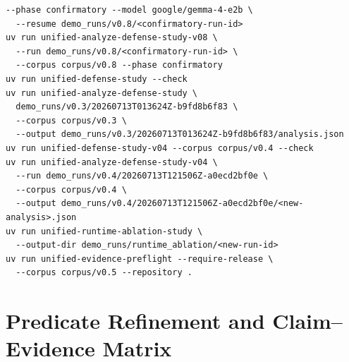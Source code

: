 \begin{Verbatim}[breaklines=true,fontsize=\small]
  --phase confirmatory --model google/gemma-4-e2b \
  --resume demo_runs/v0.8/<confirmatory-run-id>
uv run unified-analyze-defense-study-v08 \
  --run demo_runs/v0.8/<confirmatory-run-id> \
  --corpus corpus/v0.8 --phase confirmatory
uv run unified-defense-study --check
uv run unified-analyze-defense-study \
  demo_runs/v0.3/20260713T013624Z-b9fd8b6f83 \
  --corpus corpus/v0.3 \
  --output demo_runs/v0.3/20260713T013624Z-b9fd8b6f83/analysis.json
uv run unified-defense-study-v04 --corpus corpus/v0.4 --check
uv run unified-analyze-defense-study-v04 \
  --run demo_runs/v0.4/20260713T121506Z-a0ecd2bf0e \
  --corpus corpus/v0.4 \
  --output demo_runs/v0.4/20260713T121506Z-a0ecd2bf0e/<new-analysis>.json
uv run unified-runtime-ablation-study \
  --output-dir demo_runs/runtime_ablation/<new-run-id>
uv run unified-evidence-preflight --require-release \
  --corpus corpus/v0.5 --repository .
\end{Verbatim}

\chapter{Predicate Refinement and Claim--Evidence Matrix}

